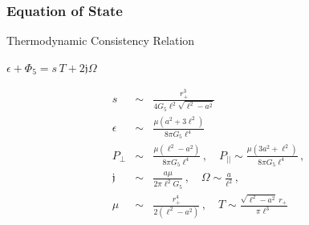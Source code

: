 \documentclass[xcolor=dvipsnames]{beamer}
\begin{document}


\begin{frame}
  \frametitle{Equation of State}

  \begin{block}{Thermodynamic Consistency Relation}
    \begin{center}
      $\epsilon + \Phi_5 = s \, T + 2\mathfrak{j}\Omega$
    \end{center}
  \end{block}

  {
    \begin{eqnarray*}
      s&\sim& \frac{r_+^3}{4 G_5 \ell^2 \sqrt{\ell^2-a^2}} \\
      \epsilon &\sim& \frac{\mu (a^2+3 \ell^2)}{8 \pi G_5 \ell^4} \\ 
      P_\perp &\sim& \frac{\mu (\ell^2-a^2) }{8 \pi G_5 \ell^4}\, , \quad P_{||} \sim \frac{\mu (3 a^2+ \ell^2)}{8 \pi G_5 \ell^4} \, , \\
      \mathfrak{j} &\sim& \frac{a \mu}{2\pi \ell^2 G_5}  \, , \quad \Omega \sim \frac{a}{\ell^2} \, , \\ 
      \mu &\sim& \frac{r_+^4}{2 (\ell^2 - a^2)} \,,\quad T \sim \frac{\sqrt{\ell^2-a^2}~r_+}{\pi \ell^3}
    \end{eqnarray*}
  }

\end{frame}
\end{document}
